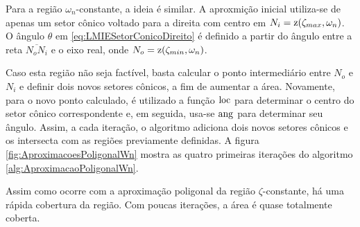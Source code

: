 Para a região $\omega_n$-constante, a ideia é similar. A aproxmição inicial utiliza-se de apenas um setor cônico voltado para a direita com centro em $N_i = \operatorname{\mathrm{z}}(\zeta_{max},\omega_n)$. O ângulo $\theta$ em \eqref{eq:LMIESetorConicoDireito} é definido a partir do ângulo entre a reta $\overline{N_oN_i}$ e o eixo real, onde $N_o = \operatorname{\mathrm{z}}(\zeta_{min},\omega_n)$.

Caso esta região não seja factível, basta calcular o ponto intermediário entre $N_o$ e $N_i$ e definir dois novos setores cônicos, a fim de aumentar a área. Novamente, para o novo ponto calculado, é utilizado a função $\operatorname{loc}$ para determinar o centro do setor cônico correspondente e, em seguida, usa-se $\operatorname{ang}$ para determinar seu ângulo. Assim, a cada iteração, o algoritmo adiciona dois novos setores cônicos e os intersecta com as regiões previamente definidas. A figura \ref{fig:AproximacoesPoligonalWn} mostra as quatro primeiras iterações do algoritmo \ref{alg:AproximacaoPoligonalWn}.

Assim como ocorre com a aproximação poligonal da região $\zeta$-constante, há uma rápida cobertura da região. Com poucas iterações, a área é quase totalmente coberta.